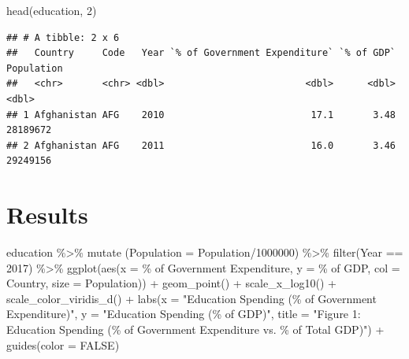 \documentclass[
]{article}
\newenvironment{Shaded}{\begin{snugshade}}{\end{snugshade}}
\newcommand{\AttributeTok}[1]{\textcolor[rgb]{0.77,0.63,0.00}{#1}}
\newcommand{\ConstantTok}[1]{\textcolor[rgb]{0.00,0.00,0.00}{#1}}
\newcommand{\DecValTok}[1]{\textcolor[rgb]{0.00,0.00,0.81}{#1}}
\newcommand{\FunctionTok}[1]{\textcolor[rgb]{0.00,0.00,0.00}{#1}}
\newcommand{\NormalTok}[1]{#1}
\newcommand{\SpecialCharTok}[1]{\textcolor[rgb]{0.00,0.00,0.00}{#1}}
\newcommand{\StringTok}[1]{\textcolor[rgb]{0.31,0.60,0.02}{#1}}
\begin{document}
\begin{Shaded}
\begin{Highlighting}[]
\FunctionTok{head}\NormalTok{(education, }\DecValTok{2}\NormalTok{)}
\end{Highlighting}
\end{Shaded}

\begin{verbatim}
## # A tibble: 2 x 6
##   Country     Code   Year `% of Government Expenditure` `% of GDP` Population
##   <chr>       <chr> <dbl>                         <dbl>      <dbl>      <dbl>
## 1 Afghanistan AFG    2010                          17.1       3.48   28189672
## 2 Afghanistan AFG    2011                          16.0       3.46   29249156
\end{verbatim}

\hypertarget{results}{%
\section{\texorpdfstring{\textbf{Results}}{Results}}\label{results}}

\begin{Shaded}
\begin{Highlighting}[]
\NormalTok{education }\SpecialCharTok{\%\textgreater{}\%} \FunctionTok{mutate}\NormalTok{ (}\AttributeTok{Population =}\NormalTok{ Population}\SpecialCharTok{/}\DecValTok{1000000}\NormalTok{) }\SpecialCharTok{\%\textgreater{}\%}
  \FunctionTok{filter}\NormalTok{(Year }\SpecialCharTok{==} \DecValTok{2017}\NormalTok{) }\SpecialCharTok{\%\textgreater{}\%}
  \FunctionTok{ggplot}\NormalTok{(}\FunctionTok{aes}\NormalTok{(}\AttributeTok{x =} \StringTok{\textasciigrave{}}\AttributeTok{\% of Government Expenditure}\StringTok{\textasciigrave{}}\NormalTok{,}
             \AttributeTok{y =} \StringTok{\textasciigrave{}}\AttributeTok{\% of GDP}\StringTok{\textasciigrave{}}\NormalTok{, }
             \AttributeTok{col =}\NormalTok{ Country,}
             \AttributeTok{size =}\NormalTok{ Population)) }\SpecialCharTok{+}
  \FunctionTok{geom\_point}\NormalTok{() }\SpecialCharTok{+} \FunctionTok{scale\_x\_log10}\NormalTok{() }\SpecialCharTok{+}
  \FunctionTok{scale\_color\_viridis\_d}\NormalTok{() }\SpecialCharTok{+}
  \FunctionTok{labs}\NormalTok{(}\AttributeTok{x =} \StringTok{"Education Spending (\% of Government Expenditure)"}\NormalTok{,}
       \AttributeTok{y =} \StringTok{"Education Spending (\% of GDP)"}\NormalTok{,}
       \AttributeTok{title =} \StringTok{"Figure 1: Education Spending (\% of Government Expenditure vs. \% of Total GDP)"}\NormalTok{) }\SpecialCharTok{+}
  \FunctionTok{guides}\NormalTok{(}\AttributeTok{color =} \ConstantTok{FALSE}\NormalTok{)}
\end{Highlighting}
\end{Shaded}
\end{document}
